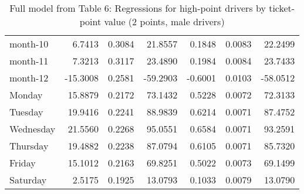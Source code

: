 \documentclass[10pt]{article}
\begin{document}
\begin{table}[ht]
\begin{tabular}{lrrrrrr}
  month-10 & 6.7413 & 0.3084 & 21.8557 & 0.1848 & 0.0083 & 22.2499 \\ 
  month-11 & 7.3213 & 0.3117 & 23.4890 & 0.1984 & 0.0084 & 23.7433 \\ 
  month-12 & -15.3008 & 0.2581 & -59.2903 & -0.6001 & 0.0103 & -58.0512 \\ 
  Monday & 15.8879 & 0.2172 & 73.1432 & 0.5228 & 0.0072 & 72.3133 \\ 
  Tuesday & 19.9416 & 0.2241 & 88.9839 & 0.6214 & 0.0071 & 87.4752 \\ 
  Wednesday & 21.5560 & 0.2268 & 95.0551 & 0.6584 & 0.0071 & 93.2591 \\ 
  Thursday & 19.4882 & 0.2238 & 87.0794 & 0.6105 & 0.0071 & 85.7320 \\ 
  Friday & 15.1012 & 0.2163 & 69.8251 & 0.5022 & 0.0073 & 69.1499 \\ 
  Saturday & 2.5175 & 0.1925 & 13.0793 & 0.1033 & 0.0079 & 13.0790 \\ 
   \hline
\end{tabular}
\caption{Full model from Table 6: Regressions for high-point drivers by ticket-point value (2 points, male drivers)} 
\label{tab_6_2_pts_no_age_M}
\end{table}


\clearpage
\pagebreak



\end{document}

